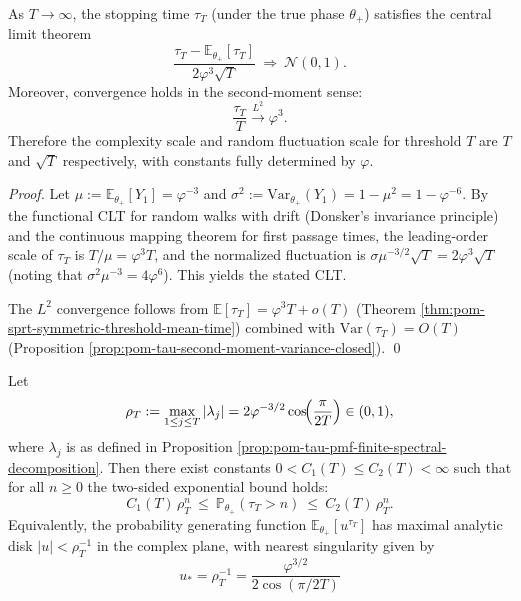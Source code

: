 \begin{theorem}\label{thm:pom-tau-clt-large-threshold}
As \(T\to\infty\), the stopping time \(\tau_T\) (under the true phase \(\theta_+\)) satisfies the central limit theorem
\[
\boxed{\;
\frac{\tau_T-\mathbb{E}_{\theta_+}[\tau_T]}{2\varphi^{3}\sqrt{T}}\ \Longrightarrow\ \mathcal{N}(0,1).\;}
\]
Moreover, convergence holds in the second-moment sense:
\[
\boxed{\;\frac{\tau_T}{T}\xrightarrow{L^2}\varphi^{3}.\;}
\]
Therefore the complexity scale and random fluctuation scale for threshold \(T\) are \(T\) and \(\sqrt{T}\) respectively, with constants fully determined by \(\varphi\).
\end{theorem}

\begin{proof}
Let \(\mu:=\mathbb{E}_{\theta_+}[Y_1]=\varphi^{-3}\) and \(\sigma^2:=\mathrm{Var}_{\theta_+}(Y_1)=1-\mu^2=1-\varphi^{-6}\).
By the functional CLT for random walks with drift (Donsker's invariance principle) and the continuous mapping theorem for first passage times, the leading-order scale of \(\tau_T\) is \(T/\mu=\varphi^{3}T\), and the normalized fluctuation is
\(
\sigma\mu^{-3/2}\sqrt{T}=2\varphi^{3}\sqrt{T}
\)
(noting that \(\sigma^2\mu^{-3}=4\varphi^6\)).
This yields the stated CLT.
\par
The \(L^2\) convergence follows from \(\mathbb{E}[\tau_T]=\varphi^{3}T+o(T)\) (Theorem \ref{thm:pom-sprt-symmetric-threshold-mean-time}) combined with
\(\mathrm{Var}(\tau_T)=O(T)\) (Proposition \ref{prop:pom-tau-second-moment-variance-closed}). \qed
\end{proof}

\begin{proposition}\label{prop:pom-tau-exponential-tail-analytic-disk}
Let
\[
\rho_T:=\max_{1\le j\le T}|\lambda_j|
=2\varphi^{-3/2}\cos\!\Bigl(\frac{\pi}{2T}\Bigr)\in(0,1),
\]
where \(\lambda_j\) is as defined in Proposition \ref{prop:pom-tau-pmf-finite-spectral-decomposition}.
Then there exist constants \(0<C_1(T)\le C_2(T)<\infty\) such that for all \(n\ge 0\) the two-sided exponential bound holds:
\[
\boxed{\;
C_1(T)\,\rho_T^{n}\ \le\ \mathbb{P}_{\theta_+}(\tau_T>n)\ \le\ C_2(T)\,\rho_T^{n}.\;}
\]
Equivalently, the probability generating function \(\mathbb{E}_{\theta_+}[u^{\tau_T}]\) has maximal analytic disk \(|u|<\rho_T^{-1}\) in the complex plane, with nearest singularity given by
\[
\boxed{\;
u_*=\rho_T^{-1}=\frac{\varphi^{3/2}}{2\cos(\pi/2T)}\;}
\]
\end{proposition}

